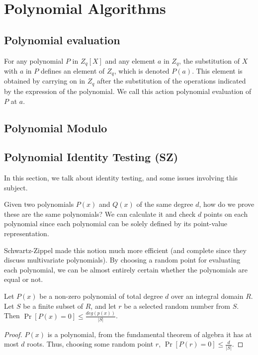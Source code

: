 
\chapter{Polynomial Algorithms}
\section{Polynomial evaluation}
\begin{defn} \label{def:poly-eval}
  For any polynomial $P$ in $Z_q[X]$ and any element $a$ in $Z_q$,
  the substitution of $X$ with $a$ in $P$ defines an element of $Z_q$, which is denoted $P(a)$.
  This element is obtained by carrying on in $Z_q$ after the substitution of the operations indicated by 
  the expression of the polynomial.
  We call this action polynomial evaluation of $P$ at $a$.
\end{defn}

\section{Polynomial Modulo}
\section{Polynomial Identity Testing (SZ)}
In this section, we talk about identity testing, 
and some issues involving this subject.

Given two polynomials $P(x)$ and $Q(x)$ of the same degree $d$, 
how do we prove these are the same polynomials?
We can calculate it and check $d$ points on each polynomial 
since each polynomial can be solely defined by its point-value representation.


Schwartz-Zippel \cite{SZ} made this notion much more efficient 
(and complete since they discuss multivariate polynomials).
By choosing a random point for evaluating each polynomial, we can 
be almost entirely certain 
whether the polynomials are equal or not.

\begin{theorem}
 Let $P(x)$ be a non-zero polynomial of total degree $d$ over 
 an integral domain $R$. Let $S$ be a finite subset of $R$, and let $r$
 be a selected random number from $S$. Then
  $\Pr [P(x)=0]\le \frac{deg(p(x))}{|S|}$.
\end{theorem}
\begin{proof}
  $P(x)$ is a polynomial, from the fundamental theorem of algebra\cite{Aigner2010} it has 
 at most $d$ roots. Thus, choosing some random point $r$,
  $\Pr [P(r)=0]\le \frac{d}{|S|}$. 
\end{proof}


